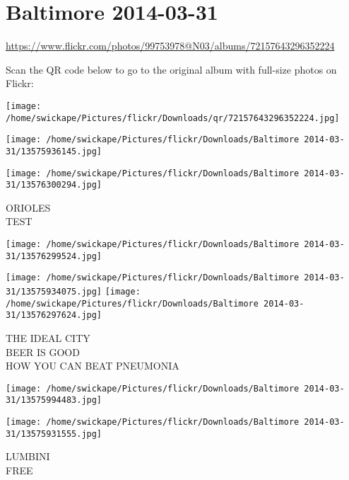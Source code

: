 \documentclass[10pt,letterpaper]{article}
\title{}
\author{}
\date{}
\begin{document}
\section*{Baltimore 2014-03-31}

\url{https://www.flickr.com/photos/99753978@N03/albums/72157643296352224}

Scan the QR code below to go to the original album with full-size photos on Flickr:

\texttt{[image: /home/swickape/Pictures/flickr/Downloads/qr/72157643296352224.jpg]}
\pagebreak

\texttt{[image: /home/swickape/Pictures/flickr/Downloads/Baltimore 2014-03-31/13575936145.jpg]}

\vspace{0.25in}
\texttt{[image: /home/swickape/Pictures/flickr/Downloads/Baltimore 2014-03-31/13576300294.jpg]}

ORIOLES\\
TEST
\pagebreak

\texttt{[image: /home/swickape/Pictures/flickr/Downloads/Baltimore 2014-03-31/13576299524.jpg]}

\vspace{0.25in}
\texttt{[image: /home/swickape/Pictures/flickr/Downloads/Baltimore 2014-03-31/13575934075.jpg]}
\texttt{[image: /home/swickape/Pictures/flickr/Downloads/Baltimore 2014-03-31/13576297624.jpg]}

THE IDEAL CITY\\
BEER IS GOOD\\
HOW YOU CAN BEAT PNEUMONIA
\pagebreak

\texttt{[image: /home/swickape/Pictures/flickr/Downloads/Baltimore 2014-03-31/13575994483.jpg]}

\vspace{0.25in}
\texttt{[image: /home/swickape/Pictures/flickr/Downloads/Baltimore 2014-03-31/13575931555.jpg]}

LUMBINI\\
FREE
\pagebreak
\end{document}
